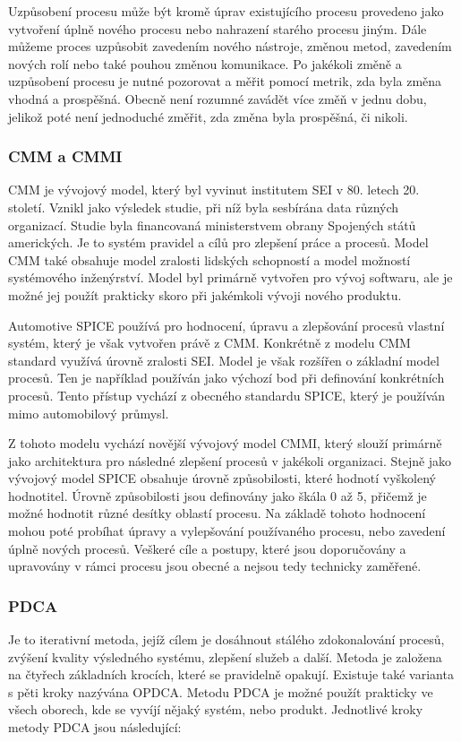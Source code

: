 \documentclass[czech,master,public,dept460,male,cpdeclaration,oneside]{diploma}
\begin{document}
Uzpůsobení procesu může být kromě úprav existujícího procesu provedeno jako vytvoření úplně nového procesu nebo nahrazení starého procesu jiným. Dále můžeme proces uzpůsobit zavedením nového nástroje, změnou metod, zavedením nových rolí nebo také pouhou změnou komunikace. Po jakékoli změně a uzpůsobení procesu je nutné pozorovat a měřit pomocí metrik, zda byla změna vhodná a prospěšná. Obecně není rozumné zavádět více změň v jednu dobu, jelikož poté není jednoduché změřit, zda změna byla prospěšná, či nikoli.

\subsubsection{CMM a CMMI}
CMM je vývojový model, který byl vyvinut institutem SEI v 80. letech 20. století. Vznikl jako výsledek studie, při níž byla sesbírána data různých organizací. Studie byla financovaná ministerstvem obrany Spojených států amerických. Je to systém pravidel a cílů pro zlepšení práce a procesů. Model CMM také obsahuje model zralosti lidských schopností a model možností systémového inženýrství. Model byl primárně vytvořen pro vývoj softwaru, ale je možné jej použít prakticky skoro při jakémkoli vývoji nového produktu. \cite{ref:cmm_cmmi}

Automotive SPICE používá pro hodnocení, úpravu a zlepšování procesů vlastní systém, který je však vytvořen právě z CMM. Konkrétně z modelu CMM standard využívá úrovně zralosti SEI. Model je však rozšířen o základní model procesů. Ten je například používán jako výchozí bod při definování konkrétních procesů. Tento přístup vychází z obecného standardu SPICE, který je používán mimo automobilový průmysl.

Z tohoto modelu vychází novější vývojový model CMMI, který slouží primárně jako architektura pro následné zlepšení procesů v jakékoli organizaci. Stejně jako vývojový model SPICE obsahuje úrovně způsobilosti, které hodnotí vyškolený hodnotitel. Úrovně způsobilosti jsou definovány jako škála 0 až 5, přičemž je možné hodnotit různé desítky oblastí procesu. Na základě tohoto hodnocení mohou poté probíhat úpravy a vylepšování používaného procesu, nebo zavedení úplně nových procesů. Veškeré cíle a postupy, které jsou doporučovány a upravovány v rámci procesu jsou obecné a nejsou tedy technicky zaměřené.

\subsubsection{PDCA}
Je to iterativní metoda, jejíž cílem je dosáhnout stálého zdokonalování procesů, zvýšení kvality výsledného systému, zlepšení služeb a další. Metoda je založena na čtyřech základních krocích, které se pravidelně opakují. Existuje také varianta s pěti kroky nazývána OPDCA. Metodu PDCA je možné použít prakticky ve všech oborech, kde se vyvíjí nějaký systém, nebo produkt.  Jednotlivé kroky metody PDCA jsou následující:
\end{document}
